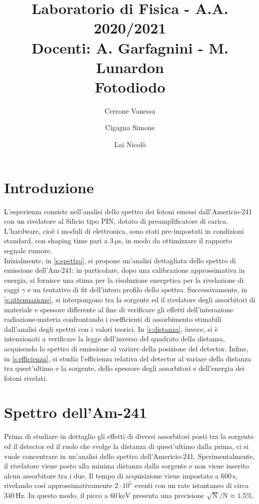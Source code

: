 \documentclass[twocolumn,10pt]{asme2ej}
\date{}
\title{{\huge\bfseries Laboratorio di Fisica} - {\LARGE A.A. 2020/2021} \\ 
    {\LARGE Docenti: A. Garfagnini - M. Lunardon} \\ {\Huge\bfseries Fotodiodo}}
\author{Cerrone Vanessa
    \affiliation{
    1200361\\
    vanessa.cerrone@studenti.unipd.it
    }	
}
\author{Cigagna Simone
    \affiliation{
	1193992\\
    simone.cigagna@studenti.unipd.it
    }	
}
\author{Lai Nicolò
    \affiliation{
	1193976\\
    nicolo.lai@studenti.unipd.it
    }	
}
\begin{document}
\maketitle    


\section{Introduzione}\label{s:introduzione}

L'esperienza consiste nell'analisi dello spettro dei fotoni emessi dall'Americio-241 con un rivelatore al Silicio tipo
PIN, dotato di preamplificatore di carica. L'hardware, cioè i moduli di elettronica, sono stati pre-impostati in
condizioni standard, con shaping time pari a $3\,\si{\micro\second}$, in modo da ottimizzare il rapporto segnale rumore.
\\

Inizialmente, in \autoref{s:spettro}, si propone un'analisi dettagliata dello spettro di emissione dell'Am-241: in
particolare, dopo una calibrazione approssimativa in energia, si fornisce una stima per la risoluzione energetica per la
rivelazione di raggi $\gamma$ e un tentativo di fit dell'intero profilo dello spettro. Successivamente, in
\autoref{s:attenuazione}, si interpongono tra la sorgente ed il rivelatore degli assorbitori di materiale e spessore
differente al fine di verificare gli effetti dell'interazione radiazione-materia confrontando i coefficienti di
assorbimento stimabili dall'analisi degli spettri con i valori teorici. In \autoref{s:distanza}, invece, si è
intenzionati a verificare la legge dell'inverso del quadrato della distanza, acquisendo lo spettro di emissione al
variare della posizione del detector. Infine, in \autoref{s:efficienza}, si studia l'efficienza relativa del detector al
variare della distanza tra quest'ultimo e la sorgente, dello spessore degli assorbitori e dell'energia dei fotoni
rivelati.



\section{Spettro dell'Am-241}\label{s:spettro}

Prima di studiare in dettaglio gli effetti di diversi assorbitori posti tra la sorgente ed il detector ed il ruolo che
svolge la distanza di quest'ultimo dalla prima, ci si vuole concentrare in un'analisi dello spettro dell'Americio-241.
Sperimentalmente, il rivelatore viene posto alla minima distanza dalla sorgente e non viene inserito alcun assorbitore
tra i due. Il tempo di acquisizione viene impostato a $600\,\si{\second}$, rivelando così approssimativamente $2 \cdot
10^5$ eventi con un rate istantaneo di circa $340\,\si{\hertz}$. In questo modo, il picco a
$60\,\si{\kilo\electronvolt}$ presenta una precisione $\sqrt{\text{N}}/\text{N} \approx 1.5\%$.
\end{document}
